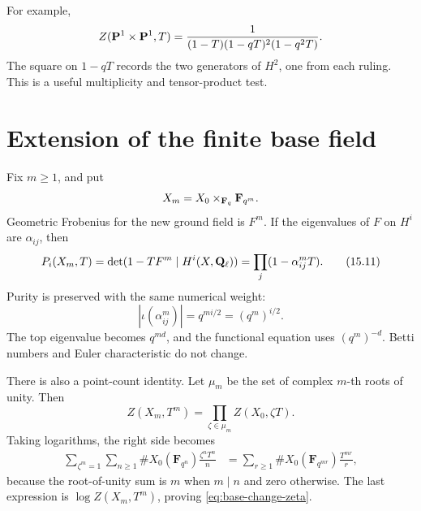 For example,
\[
 Z(\mathbf P^1\times\mathbf P^1,T)
 =\frac1{(1-T)(1-qT)^2(1-q^2T)}.
\]
The square on \(1-qT\) records the two generators of \(H^2\), one from
each ruling.  This is a useful multiplicity and tensor-product test.

\section{Extension of the finite base field}

Fix \(m\geq1\), and put
\[
 X_m=X_0\times_{\mathbf F_q}\mathbf F_{q^m}.
\]
Geometric Frobenius for the new ground field is \(F^m\).  If the
eigenvalues of \(F\) on \(H^i\) are \(\alpha_{ij}\), then
\[
 P_i(X_m,T)
 =\det(1-TF^m\mid H^i(X,\mathbf Q_\ell))
 =\prod_j(1-\alpha_{ij}^mT).
 \tag{15.11}\label{eq:base-change-polynomial}
\]
Purity is preserved with the same numerical weight:
\[
 |\iota(\alpha_{ij}^m)|=q^{mi/2}=(q^m)^{i/2}.
\]
The top eigenvalue becomes \(q^{md}\), and the functional equation uses
\((q^m)^{-d}\).  Betti numbers and Euler characteristic do not change.

There is also a point-count identity.  Let \(\mu_m\) be the set of
complex \(m\)-th roots of unity.  Then
\[
 Z(X_m,T^m)=\prod_{\zeta\in\mu_m}Z(X_0,\zeta T).
 \tag{15.12}\label{eq:base-change-zeta}
\]
Taking logarithms, the right side becomes
\[
\begin{aligned}
 \sum_{\zeta^m=1}\sum_{n\geq1}
 \#X_0(\mathbf F_{q^n})\frac{\zeta^nT^n}{n}
 &=\sum_{r\geq1}
 \#X_0(\mathbf F_{q^{mr}})\frac{T^{mr}}r,
\end{aligned}
\]
because the root-of-unity sum is \(m\) when \(m\mid n\) and zero
otherwise.  The last expression is \(\log Z(X_m,T^m)\), proving
\eqref{eq:base-change-zeta}.

